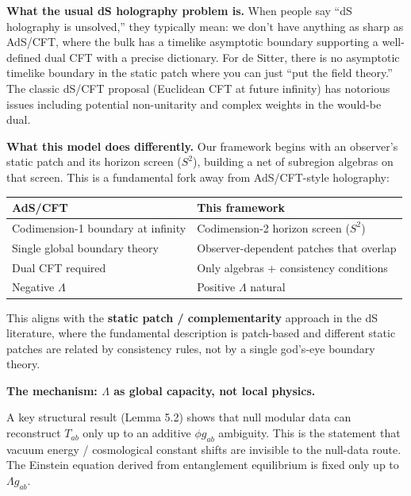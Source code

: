 \documentclass[11pt,a4paper]{article}
\theoremstyle{remark}
\begin{document}
\textbf{What the usual dS holography problem is.} When people say ``dS holography
is unsolved,'' they typically mean: we don't have anything as sharp as
AdS/CFT, where the bulk has a timelike asymptotic boundary supporting a
well-defined dual CFT with a precise dictionary. For de Sitter, there is no
asymptotic timelike boundary in the static patch where you can just ``put
the field theory.'' The classic dS/CFT proposal (Euclidean CFT at future
infinity) has notorious issues including potential non-unitarity and
complex weights in the would-be dual.

\textbf{What this model does differently.} Our framework begins with an
observer's static patch and its horizon screen (\(S^2\)), building a net of
subregion algebras on that screen. This is a fundamental fork away from
AdS/CFT-style holography:

{\def\LTcaptype{none} %
\begin{longtable}[]{@{}
  >{\raggedright\arraybackslash}p{}
  >{\raggedright\arraybackslash}p{}@{}}
\toprule\noalign{}
\begin{minipage}[b]{\linewidth}\raggedright
AdS/CFT
\end{minipage} & \begin{minipage}[b]{\linewidth}\raggedright
This framework
\end{minipage} \\
\midrule\noalign{}
\endhead
\bottomrule\noalign{}
\endlastfoot
Codimension-1 boundary at infinity & Codimension-2 horizon screen (\(S^2\)) \\
Single global boundary theory & Observer-dependent patches that overlap \\
Dual CFT required & Only algebras + consistency conditions \\
Negative \(\Lambda\) & Positive \(\Lambda\) natural \\
\end{longtable}
}

This aligns with the \textbf{static patch / complementarity} approach in the dS
literature, where the fundamental description is patch-based and different
static patches are related by consistency rules, not by a single god's-eye
boundary theory.

\textbf{The mechanism: \(\Lambda\) as global capacity, not local physics.}

A key structural result (Lemma 5.2) shows that null modular data can
reconstruct \(T_{ab}\) only up to an additive \(\phi g_{ab}\) ambiguity. This
is the statement that vacuum energy / cosmological constant shifts are
invisible to the null-data route. The Einstein equation derived from
entanglement equilibrium is fixed only up to \(\Lambda g_{ab}\).
\end{document}
